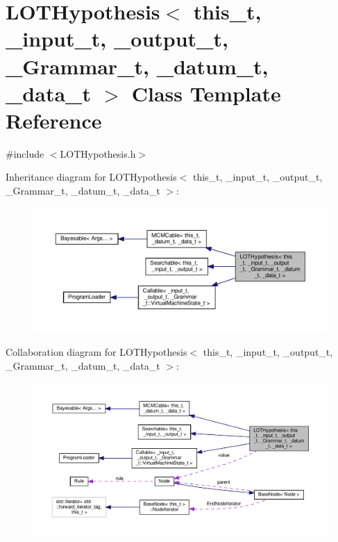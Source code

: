 \hypertarget{class_l_o_t_hypothesis}{}\section{L\+O\+T\+Hypothesis$<$ this\+\_\+t, \+\_\+input\+\_\+t, \+\_\+output\+\_\+t, \+\_\+\+Grammar\+\_\+t, \+\_\+datum\+\_\+t, \+\_\+data\+\_\+t $>$ Class Template Reference}
\label{class_l_o_t_hypothesis}


{\ttfamily \#include $<$L\+O\+T\+Hypothesis.\+h$>$}



Inheritance diagram for L\+O\+T\+Hypothesis$<$ this\+\_\+t, \+\_\+input\+\_\+t, \+\_\+output\+\_\+t, \+\_\+\+Grammar\+\_\+t, \+\_\+datum\+\_\+t, \+\_\+data\+\_\+t $>$\+:
\nopagebreak
\begin{figure}[H]
\begin{center}
\leavevmode
\includegraphics[width=350pt]{class_l_o_t_hypothesis__inherit__graph}
\end{center}
\end{figure}


Collaboration diagram for L\+O\+T\+Hypothesis$<$ this\+\_\+t, \+\_\+input\+\_\+t, \+\_\+output\+\_\+t, \+\_\+\+Grammar\+\_\+t, \+\_\+datum\+\_\+t, \+\_\+data\+\_\+t $>$\+:
\nopagebreak
\begin{figure}[H]
\begin{center}
\leavevmode
\includegraphics[width=350pt]{class_l_o_t_hypothesis__coll__graph}
\end{center}
\end{figure}
